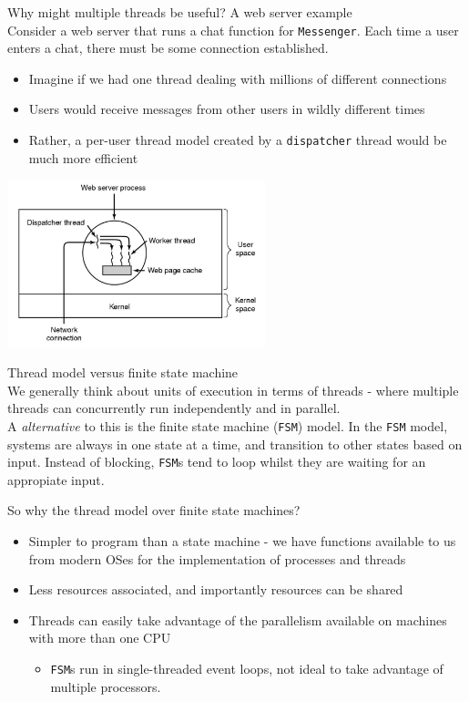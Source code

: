 \documentclass[journal, letterpaper]{IEEEtran}
\begin{document}
\begin{example}{Why might multiple threads be useful? A web server example} \\ 
    Consider a web server that runs a chat function for \verb|Messenger|. Each time a user enters a chat,
    there must be some connection established.
    \begin{itemize}
        \item Imagine if we had one thread dealing with millions of different connections
        \item Users would receive messages from other users in wildly different times
        \item Rather, a per-user thread model created by a \verb|dispatcher| thread would be much more efficient
    \end{itemize}
        \begin{center}
        \includegraphics[width=7.5cm]{./photos/network_example.png}
    \end{center}
\end{example}
\begin{aside}{Thread model versus finite state machine} \\
    We generally think about units of execution in terms of threads - where multiple threads can concurrently run independently and in parallel.
    \newline \\
    A \textit{alternative} to this is the finite state machine (\verb|FSM|) model. In the \verb|FSM| model, systems are always in one state at a time, and transition to other states based on input. Instead of blocking, \verb|FSM|s tend to loop whilst they are waiting for an appropiate input.
\end{aside}
So why the thread model over finite state machines?
\begin{itemize}
    \item Simpler to program than a state machine - we have functions available to us from modern OSes for the implementation of processes and threads
    \item Less resources associated, and importantly resources can be shared
    \item Threads can easily take advantage of the parallelism available on machines with more than one CPU
    \begin{itemize}
        \item \verb|FSM|s run in single-threaded event loops, not ideal to take advantage of multiple processors.
    \end{itemize}
\end{itemize}
\end{document}
